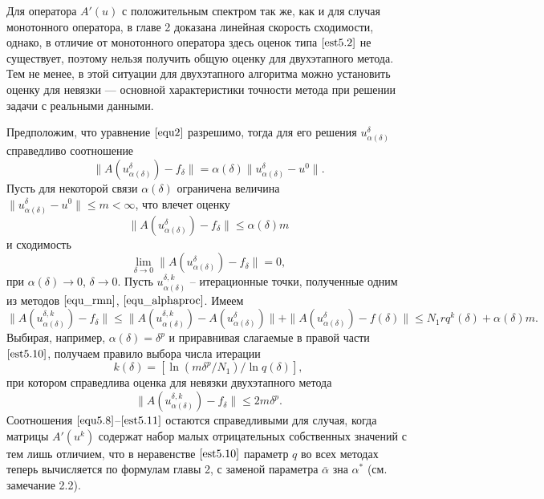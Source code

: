 Для оператора $A'(u)$ с положительным спектром так же, как и для случая монотонного оператора, в главе 2 доказана линейная скорость сходимости, однако, в отличие от монотонного оператора здесь оценок типа $\eqref{est5.2}$ не существует, поэтому нельзя получить общую оценку для двухэтапного метода. Тем не менее, в этой ситуации для двухэтапного алгоритма можно установить оценку для невязки --- основной характеристики точности метода при решении задачи с реальными данными.

Предположим, что уравнение $\eqref{equ2}$ разрешимо, тогда для его решения $u_{\alpha(\delta)}^{\delta}$ справедливо соотношение
\begin{equation}\label{equ5.8}
\|A(u_{\alpha(\delta)}^{\delta})-f_\delta\|=\alpha(\delta)\|u_{\alpha(\delta)}^{\delta}-u^0\|.
\end{equation}
Пусть для некоторой связи $\alpha(\delta)$ ограничена величина $\|u_{\alpha(\delta)}^{\delta}-u^0\|\le m <\infty$, что влечет оценку
\begin{equation}\label{est5.9}
\|A(u_{\alpha(\delta)}^{\delta})-f_\delta\|\le\alpha(\delta)m
\end{equation}
и сходимость $$\lim_{\delta\to 0}\|A(u_{\alpha(\delta)}^{\delta})-f_\delta\|=0,$$ при $\alpha(\delta)\to 0$, $\delta\to 0$. Пусть ${u_{\alpha(\delta)}^{\delta, k}}$ -- итерационные точки, полученные одним из методов $\eqref{equ_rmn}$, $\eqref{equ_alphaproc}$. Имеем
\begin{equation}\label{est5.10}
\|A(u_{\alpha(\delta)}^{\delta, k})-f_\delta\|\le\|A(u_{\alpha(\delta)}^{\delta, k})-A(u_{\alpha(\delta)}^{\delta})\|+\|A(u_{\alpha(\delta)}^{\delta})-f(\delta)\|\le N_1 r q^k(\delta)+\alpha(\delta)m.
\end{equation}
Выбирая, например, $\alpha(\delta)=\delta^p$ и приравнивая слагаемые в правой части $\eqref{est5.10}$, получаем правило выбора числа итерации
$$k(\delta)=\left [\ln(m\delta^p/N_1)/\ln q(\delta)\right ],$$
при котором справедлива оценка для невязки двухэтапного метода
\begin{equation}\label{est5.11}
\|A(u_{\alpha(\delta)}^{\delta,k})-f_\delta\|\le 2m\delta^p.
\end{equation}
{\remark Соотношения $\eqref{equ5.8}$--$\eqref{est5.11}$ остаются справедливыми для случая, когда матрицы $A'(u^k)$ содержат набор малых отрицательных собственных значений с тем лишь отличием, что в неравенстве $\eqref{est5.10}$ параметр $q$ во всех методах теперь вычисляется по формулам главы 2, с заменой параметра $\bar\alpha$ зна $\alpha^*$ (см. замечание 2.2).}


